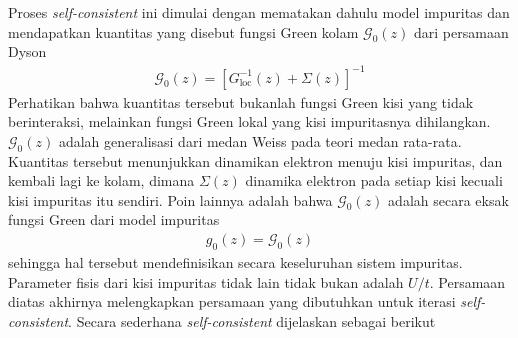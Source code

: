 Proses \textit{self-consistent} ini dimulai dengan mematakan dahulu model impuritas dan mendapatkan kuantitas yang disebut fungsi Green kolam $\mathcal{G}_0(z)$ dari persamaan Dyson
\begin{align}
\mathcal{G}_0(z) = \left[ G^{-1}_{\text{loc}}(z) + \Sigma(z) \right]^{-1}
\end{align}
Perhatikan bahwa kuantitas tersebut bukanlah fungsi Green kisi yang tidak berinteraksi, melainkan fungsi Green lokal yang kisi impuritasnya dihilangkan. $\mathcal{G}_0(z)$ adalah generalisasi dari medan Weiss pada teori medan rata-rata. Kuantitas tersebut menunjukkan dinamikan elektron menuju kisi impuritas, dan kembali lagi ke kolam, dimana $\Sigma(z)$ dinamika elektron pada setiap kisi kecuali kisi impuritas itu sendiri. Poin lainnya adalah bahwa $\mathcal{G}_0(z)$ adalah secara eksak fungsi Green dari model impuritas
\begin{align}
g_0(z) = \mathcal{G}_0(z)
\end{align}
sehingga hal tersebut mendefinisikan secara keseluruhan sistem impuritas. Parameter fisis dari kisi impuritas tidak lain tidak bukan adalah $U/t$. Persamaan diatas akhirnya melengkapkan persamaan yang dibutuhkan untuk iterasi \textit{self-consistent}. Secara sederhana \textit{self-consistent} dijelaskan sebagai berikut
